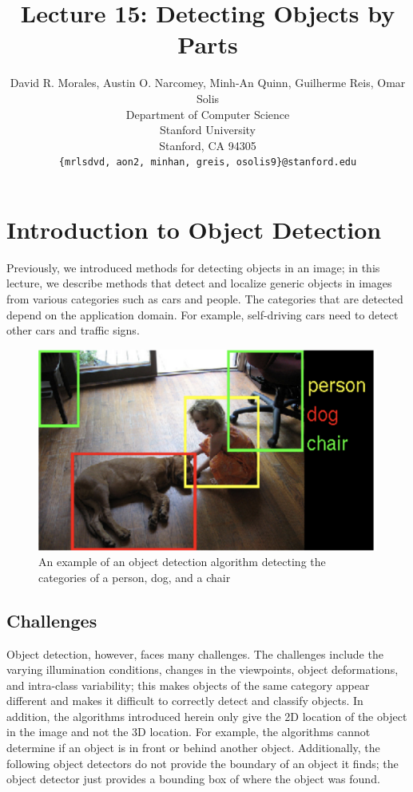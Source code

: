 \documentclass{article}
\title{Lecture 15: Detecting Objects by Parts}
\author{
  David R. Morales, Austin O. Narcomey, Minh-An Quinn, Guilherme Reis, Omar Solis \\
  Department of Computer Science\\
  Stanford University\\
  Stanford, CA 94305 \\
  \texttt{\{mrlsdvd, aon2, minhan, greis, osolis9\}@stanford.edu} 
}
\begin{document}
\maketitle


\section{Introduction to Object Detection}
Previously, we introduced methods for detecting objects in an image; in this lecture, we describe methods that detect and localize generic objects in images from various categories such as cars and people. The categories that are detected depend on the application domain. For example, self-driving cars need to detect other cars and traffic signs.
\begin{figure}[h]
	\includegraphics[width=\textwidth]{object-detector-intro.png}
    \caption{An example of an object detection algorithm detecting the categories of a person, dog, and a chair}
\end{figure}

\subsection{Challenges}
Object detection, however, faces many challenges. The challenges include the varying illumination conditions, changes in the viewpoints, object deformations, and intra-class variability; this makes objects of the same category appear different and makes it difficult to correctly detect and classify objects. In addition, the algorithms introduced herein only give the 2D location of the object in the image and not the 3D location. For example, the algorithms cannot determine if an object is in front or behind another object. Additionally, the following object detectors do not provide the boundary of an object it finds; the object detector just provides a bounding box of where the object was found.
\end{document}
